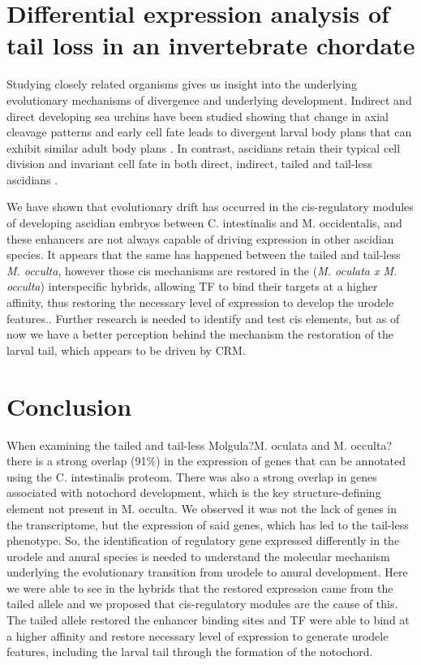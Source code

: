 \section{Differential expression analysis of tail loss in an invertebrate chordate}
Studying closely related organisms gives us insight into the underlying evolutionary mechanisms of divergence and underlying development. Indirect and direct developing sea urchins have been studied showing that change in axial cleavage patterns and early cell fate leads to divergent larval body plans that can exhibit similar adult body plans \cite{wray_evolutionary_1989,henry_evolutionary_1990}. In contrast, ascidians retain their typical cell division and invariant cell fate in both direct, indirect, tailed and tail-less ascidians \cite{jeffery_evolutionary_1991,maliska_molgula_2010}. %
   
We have shown that evolutionary drift has occurred in the cis-regulatory modules of developing ascidian embryos between C. intestinalis and M. occidentalis, and these enhancers are not always capable of driving expression in other ascidian species. It appears that the same has happened between the tailed and tail-less \textit{M. occulta}, however those cis mechanisms are restored in the (\textit{M. oculata x M. occulta}) interspecific hybrids, allowing TF to bind their targets at a higher affinity, thus restoring the necessary level of expression to develop the urodele features.. Further research is needed to identify and test cis elements, but as of now we have a better perception behind the mechanism the restoration of the larval tail, which appears to be driven by CRM.

\section{Conclusion}

When examining the tailed and tail-less Molgula?M. oculata and M. occulta?there is a strong overlap (91\%) in the expression of genes that can be annotated using the C. intestinalis proteom. There was also a strong overlap in genes associated with notochord development, which is the key structure-defining element not present in M. occulta. We observed it was not the lack of genes in the transcriptome, but the expression of said genes, which has led to the tail-less phenotype. So, the identification of regulatory gene expressed differently in the urodele and anural species is needed to understand the molecular mechanism underlying the evolutionary transition from urodele to anural development. Here we were able to see in the hybrids that the restored expression came from the tailed allele and we proposed that cis-regulatory modules are the cause of this. The tailed allele restored the enhancer binding sites and TF were able to bind at a higher affinity and restore necessary level of expression to generate urodele features, including the larval tail through the formation of the notochord.

